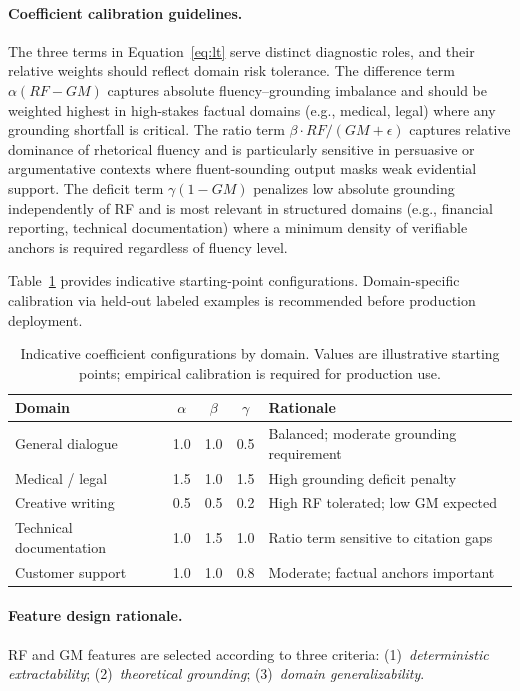 \documentclass[11pt,a4paper]{article}
\begin{document}
\paragraph{Coefficient calibration guidelines.}
The three terms in Equation~\ref{eq:lt} serve distinct diagnostic roles, and their relative
weights should reflect domain risk tolerance.
The difference term $\alpha(RF - GM)$ captures absolute fluency--grounding imbalance and
should be weighted highest in high-stakes factual domains (e.g., medical, legal) where
any grounding shortfall is critical.
The ratio term $\beta \cdot RF/(GM+\epsilon)$ captures relative dominance of rhetorical
fluency and is particularly sensitive in persuasive or argumentative contexts where
fluent-sounding output masks weak evidential support.
The deficit term $\gamma(1-GM)$ penalizes low absolute grounding independently of RF
and is most relevant in structured domains (e.g., financial reporting, technical
documentation) where a minimum density of verifiable anchors is required regardless
of fluency level.

Table~\ref{tab:coeff_guidance} provides indicative starting-point configurations.
Domain-specific calibration via held-out labeled examples is recommended before
production deployment.

\begin{table}[h]
\centering
\caption{Indicative coefficient configurations by domain. Values are illustrative
starting points; empirical calibration is required for production use.}
\label{tab:coeff_guidance}
\begin{tabular}{@{}lcccl@{}}
\toprule
Domain & $\alpha$ & $\beta$ & $\gamma$ & Rationale \\
\midrule
General dialogue     & 1.0 & 1.0 & 0.5 & Balanced; moderate grounding requirement \\
Medical / legal      & 1.5 & 1.0 & 1.5 & High grounding deficit penalty \\
Creative writing     & 0.5 & 0.5 & 0.2 & High RF tolerated; low GM expected \\
Technical documentation & 1.0 & 1.5 & 1.0 & Ratio term sensitive to citation gaps \\
Customer support     & 1.0 & 1.0 & 0.8 & Moderate; factual anchors important \\
\bottomrule
\end{tabular}
\end{table}

\paragraph{Feature design rationale.}
RF and GM features are selected according to three criteria:
(1)~\textit{deterministic extractability};
(2)~\textit{theoretical grounding};
(3)~\textit{domain generalizability}.
\end{document}
